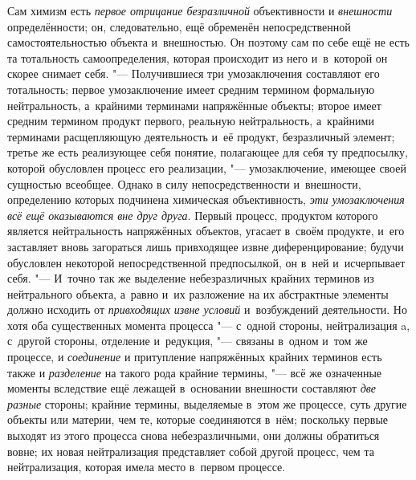 Сам химизм есть {\em первое
отрицание безразличной} объективности и
{\em внешности}
определённости; он, следовательно, ещё обременён
непосредственной самостоятельностью объекта и~внешностью. Он поэтому сам по
себе ещё не есть та тотальность самоопределения, которая происходит из него
и~в~которой он скорее снимает себя. "--- Получившиеся три
умозаключения составляют его тотальность; первое умозаключение имеет
средним термином формальную нейтральность, а~крайними терминами напряжённые
объекты; второе имеет средним термином продукт первого, реальную
нейтральность, а~крайними терминами расщепляющую деятельность и~её продукт,
безразличный элемент; третье же есть реализующее себя понятие, полагающее
для себя ту предпосылку, которой обусловлен процесс его реализации, "---
умозаключение, имеющее своей сущностью всеобщее. Однако в
силу непосредственности и~внешности, определению которых подчинена
химическая объективность, {\em эти
умозаключения всё ещё оказываются вне друг друга}. Первый
процесс, продуктом которого является нейтральность напряжённых объектов,
угасает в~своём продукте, и~его заставляет вновь загораться лишь
привходящее извне диференцирование; будучи обусловлен некоторой
непосредственной предпосылкой, он в~ней и~исчерпывает себя. "---
И~точно так же выделение небезразличных крайних терминов из
нейтрального объекта, а~равно и~их разложение на их абстрактные элементы
должно исходить от {\em привходящих
извне условий} и~возбуждений деятельности. Но хотя оба
существенных момента процесса "--- с~одной стороны,
нейтрализация a, с~другой стороны, отделение и~редукция, "---
связаны в~одном и~том же процессе, и
{\em соединение} и
притупление напряжённых крайних терминов есть также и
{\em разделение} на
такого рода крайние термины, "--- всё же означенные моменты
вследствие ещё лежащей в~основании внешности составляют
{\em две разные} стороны;
крайние термины, выделяемые в~этом же процессе, суть другие объекты или
материи, чем те, которые соединяются в~нём; поскольку первые выходят из
этого процесса снова небезразличными, они должны обратиться
вовне; их новая нейтрализация представляет собой другой процесс, чем та
нейтрализация, которая имела место в~первом процессе.

